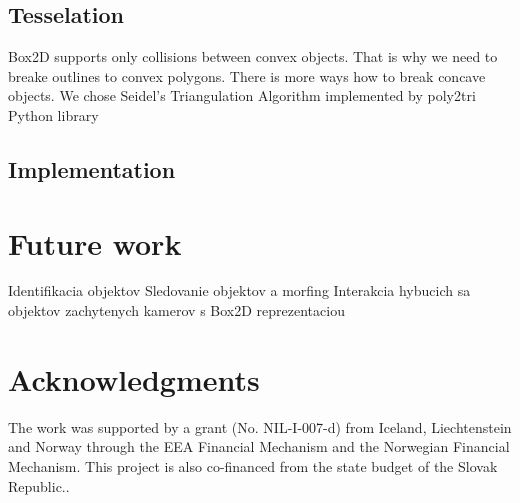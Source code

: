 \documentclass{ifacconf}
\begin{document}
\subsection{Tesselation}
Box2D supports only collisions between convex objects. That is why we need to
breake outlines to convex polygons. There is more ways how to break concave
objects. We chose Seidel's Triangulation Algorithm implemented by poly2tri
Python library

\subsection{Implementation}
\section{Future work}
Identifikacia objektov
Sledovanie objektov a morfing
Interakcia hybucich sa objektov zachytenych kamerov s Box2D reprezentaciou

\section*{Acknowledgments}
The work was supported by a grant (No. NIL-I-007-d) from Iceland, Liechtenstein 
and Norway through the EEA Financial Mechanism and the Norwegian Financial 
Mechanism. This project is also co-financed from the state budget of the Slovak
Republic..


%
\end{document}
